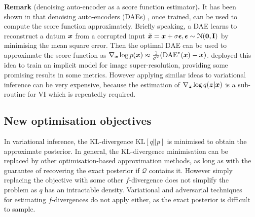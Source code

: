 \vspace{1em}
\begin{tcolorbox}
\textbf{Remark} (denoising auto-encoder as a score function estimator)\textbf{.}
It has been shown in \citet{sarela:denoising2005, alain:denoising2014} that denoising auto-encoders (DAEs) \citep{vincent:denoising2008}, once trained, can be used to compute the score function approximately. Briefly speaking, a DAE learns to reconstruct a datum $\bm{x}$ from a corrupted input $\tilde{\bm{x}} = \bm{x} + \sigma \bm{\epsilon}, \bm{\epsilon} \sim \mathcal{N}(\bm{0}, \mathbf{I})$ by minimising the mean square error. Then the optimal DAE can be used to approximate the score function as $\nabla_{\bm{x}} \log p(\bm{x}) \approx \frac{1}{\sigma^2} (\text{DAE}^*(\bm{x}) - \bm{x})$. \cite{sonderby:mapsr2016} deployed this idea to train an implicit model for image super-resolution, providing some promising results in some metrics. However applying similar ideas to variational inference can be very expensive, because the estimation of $\nabla_{\bm{z}} \log q(\bm{z} | \bm{x})$ is a sub-routine for VI which is repeatedly required.
\end{tcolorbox}

\subsection{New optimisation objectives}
In variational inference, the KL-divergence $\mathrm{KL}[q||p]$ is minimised to obtain the approximate posterior. In general, the KL-divergence minimisation can be replaced by other optimisation-based approximation methods, as long as with the guarantee of recovering the exact posterior if $\mathcal{Q}$ contains it. However simply replacing the objective with some other $f$-divergence \citep{csiszar:divergence1963, morimoto:divergence1963, ali:divergence1966} does not simplify the problem as $q$ has an intractable density. Variational and adversarial techniques for estimating $f$-divergences \citep{nguyen:divergence2007, nguyen:divergence2010, nowozin:fgan2016} do not apply either, as the exact posterior is difficult to sample. 

